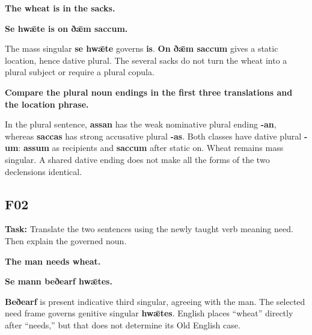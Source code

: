 \par\begin{minipage}{\linewidth}\raggedright
\textbf{The wheat is in the sacks.}

\textbf{Se hwǣte is on ðǣm saccum.}
\end{minipage}\par

The mass singular \textbf{se hwǣte} governs \textbf{is}. \textbf{On ðǣm saccum} gives a static location, hence dative plural. The several sacks do not turn the wheat into a plural subject or require a plural copula.

\textbf{Compare the plural noun endings in the first three translations and the location phrase.}

In the plural sentence, \textbf{assan} has the weak nominative plural ending \textbf{-an}, whereas \textbf{saccas} has strong accusative plural \textbf{-as}. Both classes have dative plural \textbf{-um}: \textbf{assum} as recipients and \textbf{saccum} after static on. Wheat remains mass singular. A shared dative ending does not make all the forms of the two declensions identical.

\subsection*{F02}

\textbf{Task:} Translate the two sentences using the newly taught verb meaning need. Then explain the governed noun.

\par\begin{minipage}{\linewidth}\raggedright
\textbf{The man needs wheat.}

\textbf{Se mann beðearf hwǣtes.}
\end{minipage}\par

\textbf{Beðearf} is present indicative third singular, agreeing with the man. The selected need frame governs genitive singular \textbf{hwǣtes}. English places “wheat” directly after “needs,” but that does not determine its Old English case.


